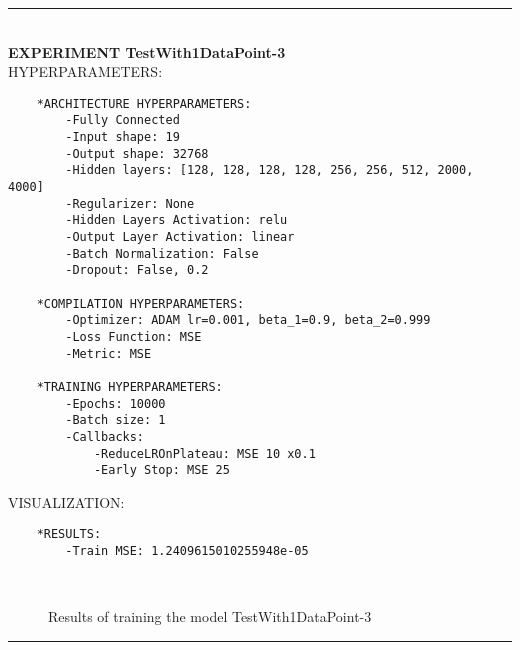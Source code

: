 \rule{0.5\textwidth}{0.5pt}\\

	{\large \textbf{EXPERIMENT TestWith1DataPoint-3}}\\
	
	{\normalsize HYPERPARAMETERS:}
	\begin{lstlisting}
	*ARCHITECTURE HYPERPARAMETERS:
		-Fully Connected
		-Input shape: 19
		-Output shape: 32768
		-Hidden layers: [128, 128, 128, 128, 256, 256, 512, 2000, 4000]
		-Regularizer: None
		-Hidden Layers Activation: relu
		-Output Layer Activation: linear
		-Batch Normalization: False
		-Dropout: False, 0.2
	
	*COMPILATION HYPERPARAMETERS:
		-Optimizer: ADAM lr=0.001, beta_1=0.9, beta_2=0.999
		-Loss Function: MSE
		-Metric: MSE
	
	*TRAINING HYPERPARAMETERS:
		-Epochs: 10000
		-Batch size: 1
		-Callbacks: 
			-ReduceLROnPlateau: MSE 10 x0.1
			-Early Stop: MSE 25
	\end{lstlisting}
	
	{\normalsize VISUALIZATION:}
	\begin{lstlisting}
	*RESULTS:
        -Train MSE: 1.2409615010255948e-05
	\end{lstlisting}
	
	\begin{figure*}[ht!]
		\hspace{\fill}
		\hspace{\fill}	
		\\
		\caption{Results of training the model TestWith1DataPoint-3}
	\end{figure*}
	
\FloatBarrier	
\rule{0.5\textwidth}{0.5pt}\\